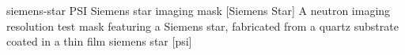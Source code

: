 \newglsXequipment%
{siemens-star}%
{PSI Siemens star imaging mask}%
[Siemens Star]%
{A neutron imaging resolution test mask featuring a Siemens star, fabricated from a quartz substrate coated in a  thin film}%
{siemens star}%
[psi]%